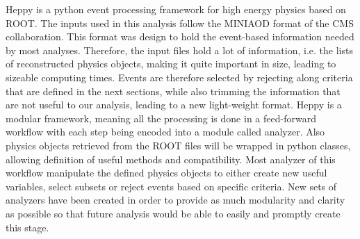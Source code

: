 Heppy is a python event processing framework for high energy physics based on ROOT. The inputs used in this analysis follow the MINIAOD format of the CMS collaboration. This format was design to hold the event-based information needed by most analyses. Therefore, the input files hold a lot of information, i.e. the lists of reconstructed physics objects, making it quite important in size, leading to sizeable computing times. Events are therefore selected by rejecting along criteria that are defined in the next sections, while also trimming the information that are not useful to our analysis, leading to a new light-weight format. Heppy is a modular framework, meaning all the processing is done in a feed-forward workflow with each step being encoded into a module called analyzer. Also physics objects retrieved from the ROOT files will be wrapped in python classes, allowing definition of useful methods and compatibility. Most analyzer of this workflow manipulate the defined physics objects to either create new useful variables, select subsets or reject events based on specific criteria. New sets of analyzers have been created in order to provide as much modularity and clarity as possible so that future analysis would be able to easily and promptly create this stage.

